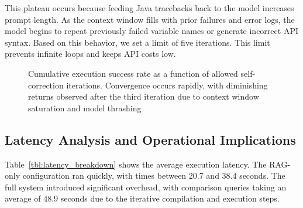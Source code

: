 \documentclass[pdflatex,sn-mathphys-ay]{sn-jnl}
\begin{document}
This plateau occurs because feeding Java tracebacks back to the model increases prompt length. As the context window fills with prior failures and error logs, the model begins to repeat previously failed variable names or generate incorrect API syntax. Based on this behavior, we set a limit of five iterations. This limit prevents infinite loops and keeps API costs low.

\begin{figure}[htbp]
    \centering
    \caption{Cumulative execution success rate as a function of allowed self-correction iterations. Convergence occurs rapidly, with diminishing returns observed after the third iteration due to context window saturation and model thrashing}
    \label{fig:iteration_ablation}
\end{figure}

\subsection{Latency Analysis and Operational Implications}\label{sec:res_latency}
Table~\ref{tbl:latency_breakdown} shows the average execution latency. The RAG-only configuration ran quickly, with times between 20.7 and 38.4 seconds. The full system introduced significant overhead, with comparison queries taking an average of 48.9 seconds due to the iterative compilation and execution steps.
\end{document}
